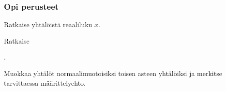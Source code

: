 \begin{tehtavasivu}

\subsubsection*{Opi perusteet}

\begin{tehtava}
    Ratkaise yhtälöistä reaaliluku $x$.
    \begin{alakohdat}
    \end{alakohdat}
    \begin{vastaus}
        \begin{alakohdat}
        \end{alakohdat}
    \end{vastaus}
\end{tehtava}

\begin{tehtava} %
    Ratkaise
    \begin{alakohdat}
            .
    \end{alakohdat}
    \begin{vastaus}
        \begin{alakohdat}
        \end{alakohdat}
    \end{vastaus}
\end{tehtava}

\begin{tehtava}
Muokkaa yhtälöt normaalimuotoisiksi toisen asteen yhtälöiksi ja merkitse tarvittaessa määrittelyehto.
    \begin{alakohdat}
    \end{alakohdat}
    \begin{vastaus}
        \begin{alakohdat}
        \end{alakohdat}
    \end{vastaus}
\end{tehtava}


\end{tehtavasivu}
